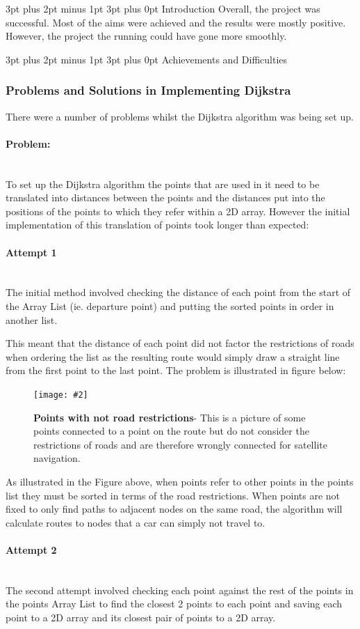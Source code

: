 \documentclass[12pt,a4paper]{article}
\makeatletter
\newcommand{\figuremacro}[5]{
    \begin{figure}[#1]
        \centering
        \texttt{[image: \#2]}
        \caption[#3]{\textbf{#3}#4}
        \label{fig:#2}
    \end{figure}
}
\renewcommand\subsection{\@startsection {subsection}{1}{0mm} %
                               {3pt plus 2pt minus 1pt} %
                               {3pt plus 0pt} %
                               {\normalfont\bfseries}}
\newcommand{\myparagraph}[1]{\paragraph{#1}\mbox{}\\}
\makeatother
\begin{document}
\subsection{Introduction}
Overall, the project was successful. Most of the aims were achieved and the results were mostly positive. However, the project the running could have gone more smoothly.

\subsection{Achievements and Difficulties}

\subsubsection{Problems and Solutions in Implementing Dijkstra}

There were a number of problems whilst the Dijkstra algorithm was being set up.
\newpage
\myparagraph{Problem:}
To set up the Dijkstra algorithm the points that are used in it need to be translated into distances between the points and the distances put into the positions of the points to which they refer within a 2D array. However the initial implementation of this translation of points took longer than expected:

\myparagraph{Attempt 1}
The initial method involved checking the distance of each point from the start of the Array List (ie. departure point) and putting the sorted points in order in another list. 

This meant that the distance of each point did not factor the restrictions of roads when ordering the list as the resulting route would simply draw a straight line from the first point to the last point. The problem is illustrated in figure below:

\figuremacro{h}{pointsWithNoStreets}{ Points with not road restrictions}{- This is a picture of some points connected to a point on the route but do not consider the restrictions of roads and are therefore wrongly connected for satellite navigation.}{0.6}

As illustrated in the Figure above, when points refer to other points in the points list they must be sorted in terms of the road restrictions. When points are not fixed to only find paths to adjacent nodes on the same road, the algorithm will calculate routes to nodes that a car can simply not travel to.

\myparagraph{Attempt 2} 
The second attempt involved checking each point against the rest of the points in the points Array List to find the closest 2 points to each point and saving each point to a 2D array and its closest pair of points to a 2D array.
\end{document}
